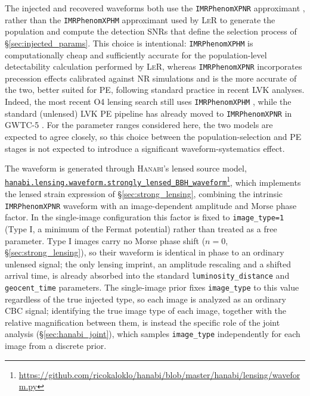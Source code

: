 The injected and recovered waveforms both use the \texttt{IMRPhenomXPNR} approximant \cite{IMRPhenomXPNR}, rather than the \texttt{IMRPhenomXPHM} approximant used by \textsc{LeR} to generate the population and compute the detection SNRs that define the selection process of \S\ref{sec:injected_params}. This choice is intentional: \texttt{IMRPhenomXPHM} is computationally cheap and sufficiently accurate for the population-level detectability calculation performed by \textsc{LeR}, whereas \texttt{IMRPhenomXPNR} incorporates precession effects calibrated against NR simulations and is the more accurate of the two, better suited for PE, following standard practice in recent LVK analyses. Indeed, the most recent O4 lensing search still uses \texttt{IMRPhenomXPHM} \cite{theligoscientificcollaboration2026gwtc40searchesgravitationalwavelensing}, while the standard (unlensed) LVK PE pipeline has already moved to \texttt{IMRPhenomXPNR} in GWTC-5 \cite{GWTC5_methods}. For the parameter ranges considered here, the two models are expected to agree closely, so this choice between the population-selection and PE stages is not expected to introduce a significant waveform-systematics effect.

The waveform is generated through \textsc{Hanabi}'s lensed source model, \href{https://github.com/ricokaloklo/hanabi/blob/master/hanabi/lensing/waveform.py}{\texttt{hanabi.\allowbreak lensing.\allowbreak waveform.\allowbreak strongly\_lensed\_BBH\_waveform}}\footnote{\url{https://github.com/ricokaloklo/hanabi/blob/master/hanabi/lensing/waveform.py}}, which implements the lensed strain expression of \S\ref{sec:strong_lensing}, combining the intrinsic \texttt{IMRPhenomXPNR} waveform with an image-dependent amplitude and Morse phase factor. In the single-image configuration this factor is fixed to \texttt{image\_type=1} (Type I, a minimum of the Fermat potential) rather than treated as a free parameter. Type I images carry no Morse phase shift ($n=0$, \S\ref{sec:strong_lensing}), so their waveform is identical in phase to an ordinary unlensed signal; the only lensing imprint, an amplitude rescaling and a shifted arrival time, is already absorbed into the standard \texttt{luminosity\_distance} and \texttt{geocent\_time} parameters. The single-image prior fixes \texttt{image\_type} to this value regardless of the true injected type, so each image is analyzed as an ordinary CBC signal; identifying the true image type of each image, together with the relative magnification between them, is instead the specific role of the joint analysis (\S\ref{sec:hanabi_joint}), which samples \texttt{image\_type} independently for each image from a discrete prior.

